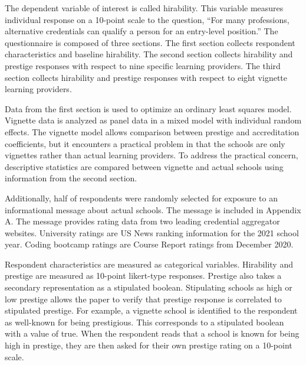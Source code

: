 \documentclass[review]{elsarticle}
\begin{document}
The dependent variable of interest is called hirability.
This variable measures individual response on a 10-point scale to the question,
``For many professions, alternative credentials can qualify a person for an entry-level position.''
The questionnaire is composed of three sections.
The first section collects respondent characteristics and baseline hirability.
The second section collects hirability and prestige responses with respect to nine specific learning providers.
The third section collects hirability and prestige responses with respect to eight vignette learning providers.

Data from the first section is used to optimize an ordinary least squares model.
Vignette data is analyzed as panel data in a mixed model with individual random effects.
The vignette model allows comparison between prestige and accreditation coefficients,
but it encounters a practical problem in that the schools are only vignettes rather than actual learning providers.
To address the practical concern,
descriptive statistics are compared between vignette and actual schools using information from the second section.

Additionally, half of respondents were randomly selected for exposure to an informational message about actual schools.
The message is included in Appendix A.
The message provides rating data from two leading credential aggregator websites.
University ratings are US News ranking information for the 2021 school year.
Coding bootcamp ratings are Course Report ratings from December 2020.


Respondent characteristics are measured as categorical variables.
Hirability and prestige are measured as 10-point likert-type responses.
Prestige also takes a secondary representation as a stipulated boolean.
Stipulating schools as high or low prestige allows the paper to verify
that prestige response is correlated to stipulated prestige.
For example, a vignette school is identified to the respondent as well-known for being prestigious.
This corresponds to a stipulated boolean with a value of true.
When the respondent reads that a school is known for being high in prestige,
they are then asked for their own prestige rating on a 10-point scale.
\end{document}

